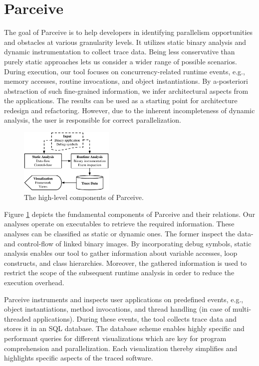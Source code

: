 \section{Parceive}
\label{sec:parceive}
The goal of Parceive is to help developers in identifying parallelism
opportunities and obstacles at various granularity levels. It utilizes static
binary analysis and dynamic instrumentation to collect trace data. Being less
conservative than purely static approaches lets us consider a wider range of
possible scenarios. During execution, our tool focuses on concurrency-related
runtime events, e.g., memory accesses, routine invocations, and object
instantiations. By a-posteriori abstraction of such fine-grained information,
we infer architectural aspects from the applications. The results can be used
as a starting point for architecture redesign and refactoring. However, due to
the inherent incompleteness of dynamic analysis, the user is responsible for
correct parallelization.

\begin{figure}[h!]
	\begin{center}
		\includegraphics[width=0.40\textwidth]{img/parceive}
		\caption{The high-level components of Parceive.}
		\label{fig:parceive_overview}
	\end{center}
\end{figure}

Figure \ref{fig:parceive_overview} depicts the fundamental components of
Parceive and their relations. Our analyses operate on executables to retrieve
the required information. These analyses can be classified as static or dynamic
ones. The former inspect the data- and control-flow of linked binary images. By
incorporating debug symbols, static analysis enables our tool to gather
information about variable accesses, loop constructs, and class hierarchies.
Moreover, the gathered information is used to restrict the scope of
the subsequent runtime analysis in order to reduce the execution overhead.

Parceive instruments and inspects user applications on predefined events, e.g.,
object instantiations, method invocations, and thread handling (in case of
multi-threaded applications). During these events, the tool collects trace data
and stores it in an SQL database. The database scheme enables highly specific
and performant queries for different visualizations which are key for program
comprehension and parallelization. Each visualization thereby simplifies and
highlights specific aspects of the traced software.